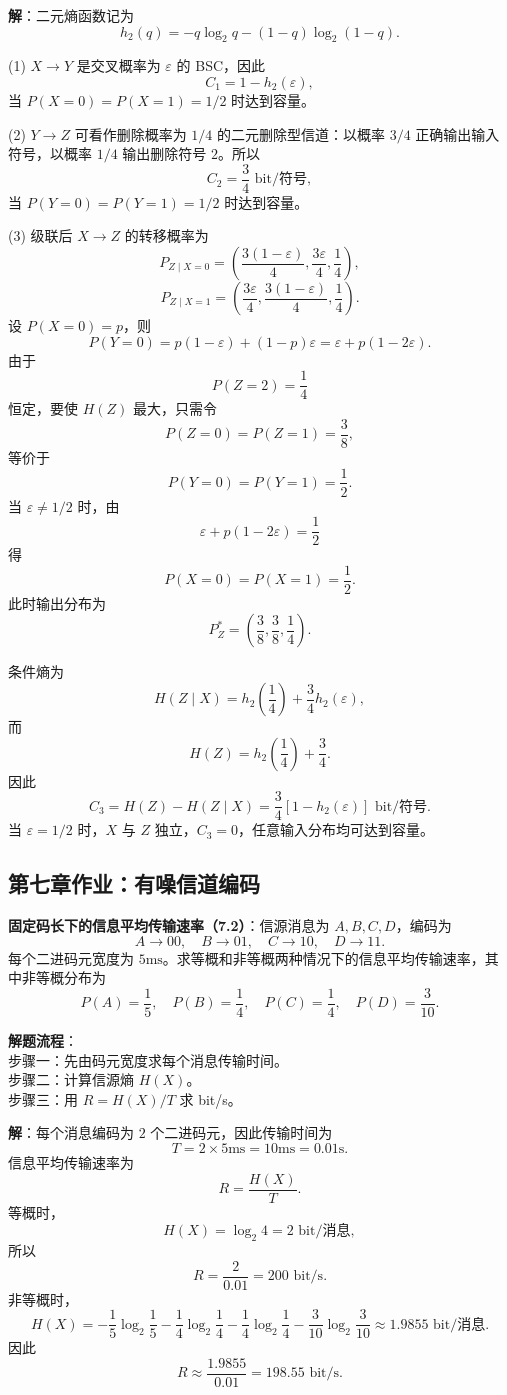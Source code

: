 \begin{example}
\textbf{解}：二元熵函数记为
\[
h_2(q)=-q\log_2q-(1-q)\log_2(1-q).
\]

(1) $X\to Y$ 是交叉概率为 $\varepsilon$ 的 BSC，因此
\[
C_1=1-h_2(\varepsilon),
\]
当 $P(X=0)=P(X=1)=1/2$ 时达到容量。

(2) $Y\to Z$ 可看作删除概率为 $1/4$ 的二元删除型信道：以概率 $3/4$ 正确输出输入符号，以概率 $1/4$ 输出删除符号 $2$。所以
\[
C_2=\frac34\text{ bit/符号},
\]
当 $P(Y=0)=P(Y=1)=1/2$ 时达到容量。

(3) 级联后 $X\to Z$ 的转移概率为
\[
P_{Z\mid X=0}=\left(\frac{3(1-\varepsilon)}{4},\frac{3\varepsilon}{4},\frac14\right),
\]
\[
P_{Z\mid X=1}=\left(\frac{3\varepsilon}{4},\frac{3(1-\varepsilon)}{4},\frac14\right).
\]
设 $P(X=0)=p$，则
\[
P(Y=0)=p(1-\varepsilon)+(1-p)\varepsilon
=\varepsilon+p(1-2\varepsilon).
\]
由于
\[
P(Z=2)=\frac14
\]
恒定，要使 $H(Z)$ 最大，只需令
\[
P(Z=0)=P(Z=1)=\frac38,
\]
等价于
\[
P(Y=0)=P(Y=1)=\frac12.
\]
当 $\varepsilon\ne1/2$ 时，由
\[
\varepsilon+p(1-2\varepsilon)=\frac12
\]
得
\[
P(X=0)=P(X=1)=\frac12.
\]
此时输出分布为
\[
P_Z^*=\left(\frac38,\frac38,\frac14\right).
\]

条件熵为
\[
H(Z\mid X)=h_2\left(\frac14\right)+\frac34h_2(\varepsilon),
\]
而
\[
H(Z)=h_2\left(\frac14\right)+\frac34.
\]
因此
\[
C_3=H(Z)-H(Z\mid X)
=\frac34\left[1-h_2(\varepsilon)\right]\text{ bit/符号}.
\]
当 $\varepsilon=1/2$ 时，$X$ 与 $Z$ 独立，$C_3=0$，任意输入分布均可达到容量。
\end{example}

\subsection{第七章作业：有噪信道编码}

\begin{example}
\label{hw:ch7-2-fixed-code-length-transmission-rate}
\textbf{固定码长下的信息平均传输速率（7.2）}：信源消息为 $A,B,C,D$，编码为
\[
A\to00,
\quad B\to01,
\quad C\to10,
\quad D\to11.
\]
每个二进码元宽度为 $5\text{ms}$。求等概和非等概两种情况下的信息平均传输速率，其中非等概分布为
\[
P(A)=\frac15,
\quad P(B)=\frac14,
\quad P(C)=\frac14,
\quad P(D)=\frac3{10}.
\]

\noindent \textbf{解题流程}：\\[2pt]
步骤一：先由码元宽度求每个消息传输时间。\\
步骤二：计算信源熵 $H(X)$。\\
步骤三：用 $R=H(X)/T$ 求 bit/s。

\textbf{解}：每个消息编码为 $2$ 个二进码元，因此传输时间为
\[
T=2\times5\text{ms}=10\text{ms}=0.01\text{s}.
\]
信息平均传输速率为
\[
R=\frac{H(X)}{T}.
\]
等概时，
\[
H(X)=\log_2 4=2\text{ bit/消息},
\]
所以
\[
R=\frac{2}{0.01}=200\text{ bit/s}.
\]
非等概时，
\[
H(X)=-\frac15\log_2\frac15-\frac14\log_2\frac14
-\frac14\log_2\frac14-\frac3{10}\log_2\frac3{10}
\approx1.9855\text{ bit/消息}.
\]
因此
\[
R\approx\frac{1.9855}{0.01}=198.55\text{ bit/s}.
\]
\end{example}

